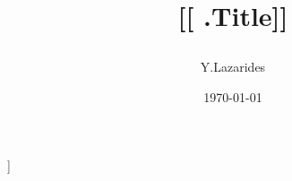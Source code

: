 \documentclass[a4paper, oneside, 
               justified=true, sfsidenotes]{scrbook}
\date{\today}
\begin{document}
\title{[[ .Title]] \author{Y.Lazarides}}
\maketitle
[[ .Body]]\lipsum[1-10]
\end{document}

